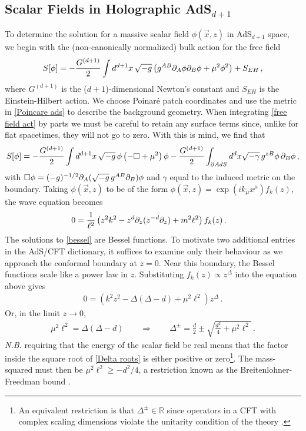 \documentclass[../PhD.tex]{subfiles}
\begin{document}

\subsection{Scalar Fields in Holographic AdS$_{d+1}$}
\label{ssec: scalar fields}

To determine the solution for a massive scalar field $\phi(\vec x, z)$ in AdS$_{d+1}$ space, we begin with the (non-canonically normalized) bulk action for the free field
\begin{align}
\label{free field act}
S[\phi] = -\frac{G^{(d+1)}}{2} \int d^{d+1} x \, \sqrt{-g} \left( g^{AB} \partial_A \phi \partial_B \phi + \mu^2 \phi^2 \right) + S_{EH} \, ,
\end{align}
where $G^{(d+1)}$ is the ($d+1$)-dimensional Newton's constant and $S_{EH}$ is the Einstein-Hilbert action. We choose Poinar\'e patch coordinates and use the metric in \eqref{Poincare ads} to describe the background geometry. When integrating \eqref{free field act} by parts we must be careful to retain any surface terms since, unlike for flat spacetimes, they will not go to zero. With this is mind, we find that
\begin{align}
\label{action int by parts}
S[\phi] = -\frac{G^{(d+1)}}{2} \int d^{d+1}x \, \sqrt{-g}\, \phi \left( - \Box + \mu^2 \right) \phi - \frac{G^{(d+1)}}{2}\int_{\partial AdS} d^d x \sqrt{-\gamma} \, g^{zB} \phi \, \partial_B \phi \, ,
\end{align}
with $\Box \phi = (-g)^{-1/2} \partial_A (\sqrt{-g} \, g^{AB} \partial_B) \phi$ and $\gamma$ equal to the induced metric on the boundary. Taking $\phi(\vec x, z)$ to be of the form $\phi(\vec x, z) = \exp( i k_\mu x^\mu) f_k (z)$, the wave equation becomes
\begin{align}
\label{bessel}
0 &= \frac{1}{\ell^2} \left( z^2 k^2 - z^{d} \partial_z (z^{-d} \partial_z ) + m^2 \ell^2 \right) f_k(z) \, .
\end{align}
The solutions to \eqref{bessel} are Bessel functions. To motivate two additional entries in the AdS/CFT dictionary, it suffices to examine only their behaviour as we approach the conformal boundary at $z = 0$. Near this boundary, the Bessel functions scale like a power law in $z$. Substituting $f_k(z) \propto z^{\Delta}$ into the equation above gives
\begin{align}
0 = \left(k^2 z^2 - \Delta(\Delta - d) + \mu^2 \ell^2 \right) z^\Delta \, .
\end{align}
Or, in the limit $z \to 0$,
\begin{align}
\label{Delta roots}
\mu^2 \ell^2 = \Delta (\Delta - d) \qquad \Rightarrow \qquad \Delta^{\pm} = \frac{d}{2} \pm \sqrt{\frac{d^2}{4} + \mu^2\ell^2} \, .
\end{align}
{\it N.B.} requiring that the energy of the scalar field be real means that the factor inside the square root of \eqref{Delta roots} is either positive or zero\footnote{An equivalent restriction is that $\Delta^{\pm} \in \mathbb{R}$ since operators in a CFT with complex scaling dimensions violate the unitarity condition of the theory \cite{1805.04405}.}. The mass-squared must then be $\mu^2 \ell^2 \geq - d^2 /4$, a restriction known as the Breitenlohner-Freedman bound \cite{Breitenlohner:1982bm}. 
\end{document}
